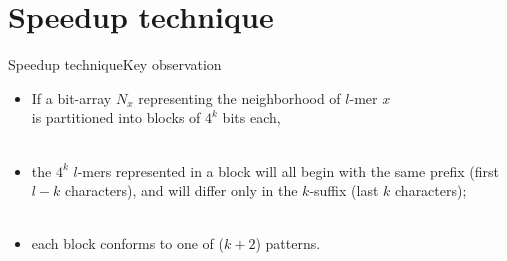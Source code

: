 \documentclass[pdf,xcolor={dvipsnames}]{beamer}
\begin{document}
\section{Speedup technique}
	\begin{frame}{Speedup technique}{Key observation}
		\begin{itemize}
		\item<1-> If a bit-array $N_x$ representing the neighborhood of $l$-mer $x$
		\\ is partitioned into blocks of $4^k$ bits each,\\\ \\
		\end{itemize}
		\begin{itemize}
		\item<3-> the $4^k$ $l$-mers represented in a block will all begin with the same {prefix} (first $l-k$ characters), and will differ only in the {$k$-suffix} (last $k$ characters);\\\ \\
		\item<4-> {each block conforms to one of ($k + 2$) patterns.}\\\ \\
		\end{itemize}
		\ \\
	\end{frame}
\end{document}
